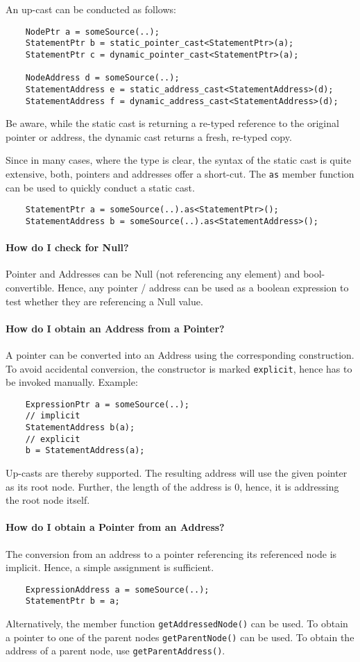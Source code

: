 An up-cast can be conducted as follows:
\begin{lstlisting}
	NodePtr a = someSource(..);
	StatementPtr b = static_pointer_cast<StatementPtr>(a);
	StatementPtr c = dynamic_pointer_cast<StatementPtr>(a);

	NodeAddress d = someSource(..);
	StatementAddress e = static_address_cast<StatementAddress>(d);
	StatementAddress f = dynamic_address_cast<StatementAddress>(d);
\end{lstlisting}

Be aware, while the static cast is returning a re-typed reference to the
original pointer or address, the dynamic cast returns a fresh, re-typed copy.

Since in many cases, where the type is clear, the syntax of the static cast is
quite extensive, both, pointers and addresses offer a short-cut. The \texttt{as}
member function can be used to quickly conduct a static cast.

\begin{lstlisting}
	StatementPtr a = someSource(..).as<StatementPtr>();
	StatementAddress b = someSource(..).as<StatementAddress>();
\end{lstlisting}

\paragraph{How do I check for Null?}
Pointer and Addresses can be Null (not referencing any element) and
bool-convertible. Hence, any pointer / address can be used as a boolean
expression to test whether they are referencing a Null value.

\paragraph{How do I obtain an Address from a Pointer?}
A pointer can be converted into an Address using the corresponding construction.
To avoid accidental conversion, the constructor is marked \lstinline|explicit|,
hence has to be invoked manually. Example:
\begin{lstlisting}
	ExpressionPtr a = someSource(..);
	// implicit
	StatementAddress b(a);
	// explicit
	b = StatementAddress(a);
\end{lstlisting}
Up-casts are thereby supported. The resulting address will use the given pointer
as its root node. Further, the length of the address is 0, hence, it is
addressing the root node itself.

\paragraph{How do I obtain a Pointer from an Address?}
The conversion from an address to a pointer referencing its referenced node is
implicit. Hence, a simple assignment is sufficient.
\begin{lstlisting}
	ExpressionAddress a = someSource(..);
	StatementPtr b = a;
\end{lstlisting}
Alternatively, the member function \lstinline|getAddressedNode()| can be used.
To obtain a pointer to one of the parent nodes \lstinline|getParentNode()| can
be used. To obtain the address of a parent node, use
\lstinline|getParentAddress()|.

